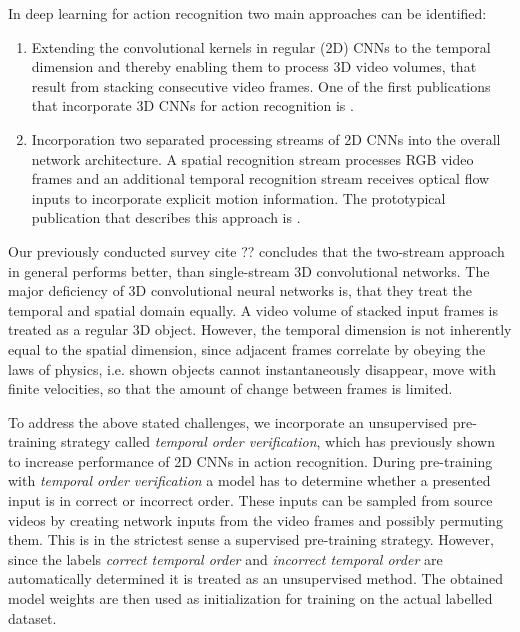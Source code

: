 In deep learning for action recognition two main approaches can be identified:
\begin{enumerate}
    \item
    Extending the convolutional kernels in regular (2D) CNNs to the temporal dimension and thereby enabling them to process 3D video volumes, that result from stacking consecutive video frames.
    One of the first publications that incorporate 3D CNNs for action recognition is \cite{ji_3d_2013}.
    \item
    Incorporation two separated processing streams of 2D CNNs into the overall network architecture. A spatial recognition stream processes RGB video frames and an additional temporal recognition stream receives optical flow inputs to incorporate explicit motion information. The prototypical publication that describes this approach is \cite{simonyan_two-stream_2014}.
\end{enumerate}

Our previously conducted survey cite ?? concludes that the two-stream approach in general performs better, than single-stream 3D convolutional networks.
The major deficiency of 3D convolutional neural networks is, that they treat the temporal and spatial domain equally.
A video volume of stacked input frames is treated as a regular 3D object.
However, the temporal dimension is not inherently equal to the spatial dimension, since adjacent frames correlate by obeying the laws of physics, i.e. shown objects cannot instantaneously disappear, move with finite velocities, so that the amount of change between frames is limited.

To address the above stated challenges, we incorporate an unsupervised pre-training strategy called \textit{temporal order verification}, which has previously shown to increase performance of 2D CNNs in action recognition.
During pre-training with \textit{temporal order verification} a model has to determine whether a presented input is in correct or incorrect order.
These inputs can be sampled from source videos by creating network inputs from the video frames and possibly permuting them.
This is in the strictest sense a supervised pre-training strategy.
However, since the labels \textit{correct temporal order} and \textit{incorrect temporal order} are automatically determined it is treated as an unsupervised method.
The obtained model weights are then used as initialization for training on the actual labelled dataset.

